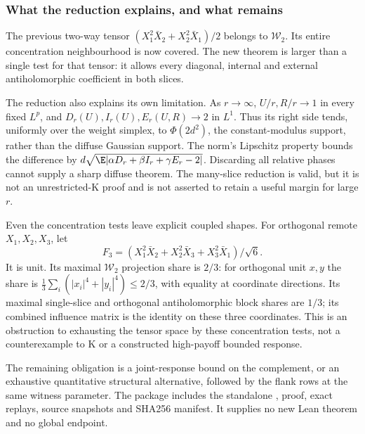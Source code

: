 \subsubsection{What the reduction explains, and what remains}
The previous two-way tensor
$(X_1^2\bar X_2+X_2^2\bar X_1)/2$ belongs to $\mathcal W_2$.
Its entire concentration neighbourhood is now covered. The new theorem
is larger than a single test for that tensor: it allows every diagonal,
internal and external antiholomorphic coefficient in both slices.

The reduction also explains its own limitation. As $r\to\infty$,
$U/r,R/r\to1$ in every fixed $L^p$, and
$D_r(U),I_r(U),E_r(U,R)\to2$ in $L^1$.
Thus its right side tends, uniformly over the weight simplex, to
$\Phi(2d^2)$, the constant-modulus support, rather than the diffuse
Gaussian support. The norm's Lipschitz property bounds the difference
by $d\sqrt{\E|\alpha D_r+\beta I_r+\gamma E_r-2|}$.
Discarding all relative phases cannot supply a sharp diffuse theorem.
The many-slice reduction is valid, but it is not an unrestricted-K
proof and is not asserted to retain a useful margin for large $r$.

Even the concentration tests leave explicit coupled shapes. For
orthogonal remote $X_1,X_2,X_3$, let
\[
 F_3=(X_1^2\bar X_2+X_2^2\bar X_3+X_3^2\bar X_1)/\sqrt6.
\]
It is unit. Its maximal $\mathcal W_2$ projection share is $2/3$:
for orthogonal unit $x,y$ the share is
$\frac13\sum_i(|x_i|^4+|y_i|^4)\le2/3$, with equality at coordinate
directions. Its maximal single-slice and orthogonal antiholomorphic
block shares are $1/3$; its combined influence matrix is the identity
on these three coordinates. This is an obstruction to exhausting the
tensor space by these concentration tests, not a counterexample to K
or a constructed high-payoff bounded response.

The remaining obligation is a joint-response bound on the complement,
or an exhaustive quantitative structural alternative, followed by the
flank rows at the same witness parameter. The package
 includes the standalone
, proof, exact replays, source snapshots and SHA256
manifest. It supplies no new Lean theorem and no global endpoint.
